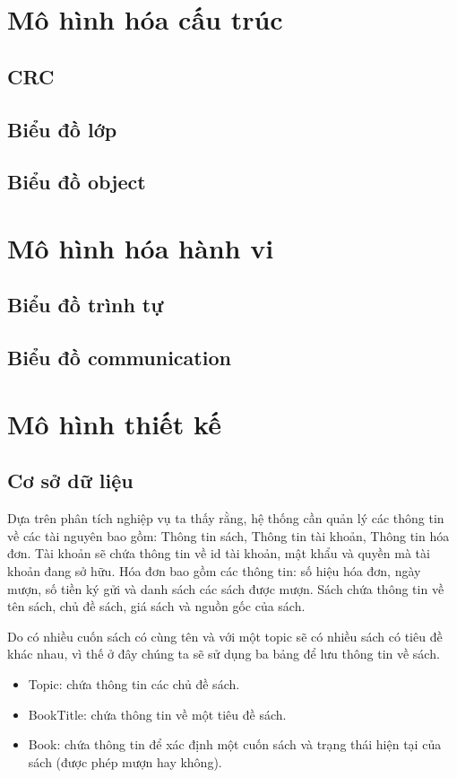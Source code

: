 \documentclass[12pt]{report}
\begin{document}
\section{Mô hình hóa cấu trúc}

\subsection{CRC}
\renewcommand{\arraystretch}{1.5}



\subsection{Biểu đồ lớp}
\subsection{Biểu đồ object}

\section{Mô hình hóa hành vi}
\subsection{Biểu đồ trình tự}
\renewcommand{\arraystretch}{1.5}

\subsection{Biểu đồ communication}

\section{Mô hình thiết kế}
\subsection{Cơ sở dữ liệu}
Dựa trên phân tích nghiệp vụ ta thấy rằng, hệ thống cần quản lý các thông 
tin về các tài nguyên bao gồm: Thông tin sách, Thông tin tài khoản, 
Thông tin hóa đơn.
Tài khoản sẽ chứa thông tin về id tài khoản, mật khẩu và quyền mà 
tài khoản đang sở hữu.
Hóa đơn bao gồm các thông tin: số hiệu hóa đơn, ngày mượn, 
số tiền ký gửi và danh sách các sách được mượn.
Sách chứa thông tin về tên sách, chủ đề sách, 
giá sách và nguồn gốc của sách. 

Do có nhiều cuốn sách có cùng tên và với một topic sẽ có nhiều sách có tiêu đề khác nhau,
vì thế ở đây chúng ta sẽ sử dụng ba bảng để lưu thông tin về sách. 
\begin{itemize}
      \item Topic: chứa thông tin các chủ đề sách.
\item BookTitle: chứa thông tin về một tiêu đề sách.
\item Book: chứa thông tin để xác định một cuốn sách và trạng thái 
hiện tại của sách (được phép mượn hay không).

\end{itemize}
\end{document}
